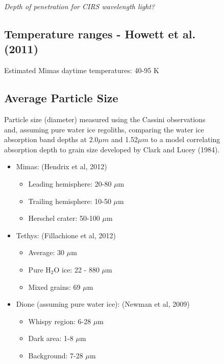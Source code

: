 \documentclass[11pt]{article} %
\begin{document}
\begin{figure}[ht]
\begin{Table}
\begin{Comment}
	\emph{Depth of penetration for CIRS wavelength light?}
	
\subsection{Temperature ranges - Howett et al. (2011)}
\label{sec:temperature}

	Estimated Mimas daytime temperatures: 40-95 K
	
\subsection{Average Particle Size}
\label{sec:size}

	
Particle size (diameter) measured using the Cassini observations and, assuming pure water ice regoliths, comparing the water ice absorption band depths at 2.0$\mu m$ and 1.52$\mu m$ to a model correlating absorption depth to grain size developed by Clark and Lucey (1984).

	\begin{itemize}
	\item Mimas: (Hendrix et al, 2012)
	\begin{itemize}
		\item Leading hemisphere: 20-80 $\mu$m
		\item Trailing hemisphere: 10-50 $\mu$m
		\item Herschel crater: 50-100 $\mu$m
	\end{itemize}

	\item Tethys: (Fillachione et al, 2012)
	\begin{itemize}
		\item Average: 30 $\mu$m
		\item Pure H$_{2}$O ice: 22 - 880 $\mu$m
		\item Mixed grains: 69 $\mu$m
	\end{itemize}

	\item Dione (assuming pure water ice): (Newman et al, 2009)
	\begin{itemize}
		\item Whispy region: 6-28 $\mu$m
		\item Dark area: 1-8 $\mu$m
		\item Background: 7-28 $\mu$m
	\end{itemize}
	\end{itemize}


\end{Comment}
\end{Table}
\end{figure}
\end{document}
